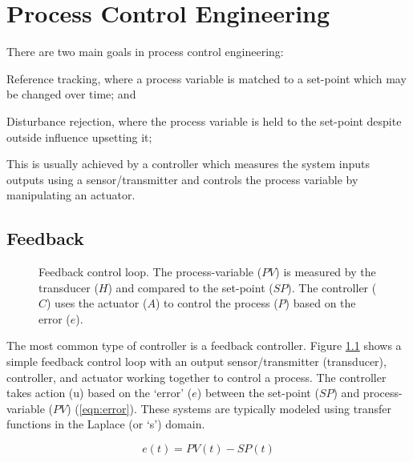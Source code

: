 \chapter{Process Control Engineering}
\label{Chapter:Controls}

There are two main goals in process control engineering:
\begin{enumerate*}
    \item Reference tracking, where a process variable is matched to a set-point which may be changed over time; and 
    \item Disturbance rejection, where the process variable is held to the set-point despite outside influence upsetting it;
\end{enumerate*}
This is usually achieved by a controller which measures the system inputs \andor outputs using a sensor/transmitter and controls the process variable by manipulating an actuator. 

\section{Feedback}
\begin{figure}[!ht]
    \centering
    
    \caption[Feedback control loop]{Feedback control loop. The process-variable ($PV$) is measured by the transducer ($H$) and compared to the set-point ($SP$). The controller ($C$) uses the actuator ($A$) to control the process ($P$) based on the error ($e$).}
    \label{fig:tikz_feedback}
\end{figure}

The most common type of controller is a feedback controller. Figure \ref{fig:tikz_feedback} shows a simple feedback control loop with an output sensor/transmitter (\ie transducer), controller, and actuator working together to control a process. The controller takes action (u) based on the `error' ($e$) between the set-point ($SP$) and process-variable ($PV$) (\ref{eqn:error}). These systems are typically modeled using transfer functions in the Laplace (or `s') domain.

\begin{equation}\label{eqn:error}
    e(t) = PV(t) - SP(t)
\end{equation}

